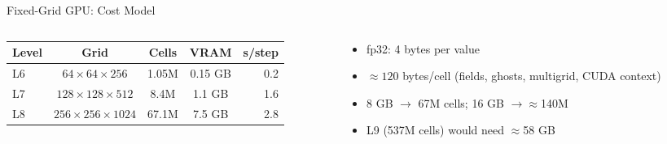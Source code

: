 \documentclass[10pt,aspectratio=43]{beamer}
\begin{document}
\begin{frame}{Fixed-Grid GPU: Cost Model}
  \begin{columns}[T]
    \begin{column}{0.58\textwidth}
      \centering
      {\scriptsize\setlength{\tabcolsep}{3pt}
      \begin{tabular}{@{}lccc r@{}}
        \toprule
        Level & Grid & Cells & VRAM & s/step \\
        \midrule
        L6 & $64\times64\times256$    & 1.05M & 0.15 GB & 0.2 \\
        L7 & $128\times128\times512$  & 8.4M  & 1.1 GB  & 1.6 \\
        L8 & $256\times256\times1024$ & 67.1M & 7.5 GB  & 2.8 \\
        \bottomrule
      \end{tabular}}
    \end{column}
    \begin{column}{0.39\textwidth}
      \begin{itemize}
        \item fp32: 4 bytes per value
        \item $\approx 120$ bytes/cell (fields, ghosts, multigrid, CUDA context)
        \item 8 GB $\to$ 67M cells; 16 GB $\to\approx$140M
        \item L9 (537M cells) would need $\approx$58 GB
      \end{itemize}
    \end{column}
  \end{columns}
\end{frame}
\end{document}
